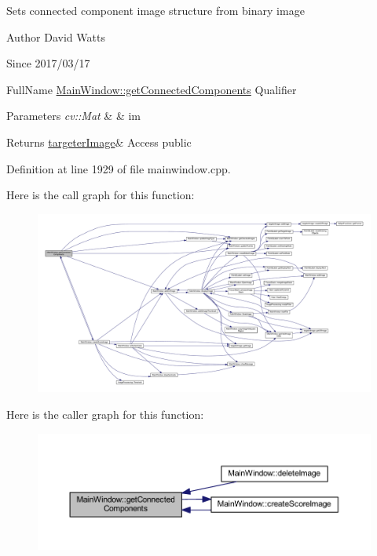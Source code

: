 Sets connected component image structure from binary image

\begin{DoxyAuthor}{Author}
David Watts 
\end{DoxyAuthor}
\begin{DoxySince}{Since}
2017/03/17
\end{DoxySince}
Full\+Name \hyperlink{class_main_window_a49cfabc6ef4845c5a9b5c9a92c9d4e2e}{Main\+Window\+::get\+Connected\+Components} Qualifier 
\begin{DoxyParams}{Parameters}
{\em cv\+::\+Mat} & \& im \\
\hline
\end{DoxyParams}
\begin{DoxyReturn}{Returns}
\hyperlink{classtargeter_image}{targeter\+Image}\& Access public 
\end{DoxyReturn}


Definition at line 1929 of file mainwindow.\+cpp.

Here is the call graph for this function\+:
\nopagebreak
\begin{figure}[H]
\begin{center}
\leavevmode
\includegraphics[width=350pt]{class_main_window_a49cfabc6ef4845c5a9b5c9a92c9d4e2e_cgraph}
\end{center}
\end{figure}
Here is the caller graph for this function\+:
\nopagebreak
\begin{figure}[H]
\begin{center}
\leavevmode
\includegraphics[width=350pt]{class_main_window_a49cfabc6ef4845c5a9b5c9a92c9d4e2e_icgraph}
\end{center}
\end{figure}
\mbox{\label{class_main_window_a2734ce9308b5847a561f00b2fc9066aa}} 
